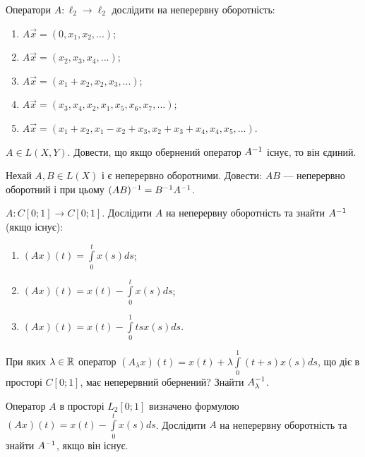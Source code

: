 
\begin{exercise}
    Оператори $A: \ell_2 \to \ell_2$ дослідити на неперервну оборотність:
    \begin{enumerate}
        \item $A\vec{x} = (0, x_1, x_2, ...)$;
        \item $A\vec{x} = (x_2, x_3, x_4, ...)$;
        \item $A\vec{x} = (x_1+x_2, x_2, x_3, ...)$;
        \item $A\vec{x} = (x_3, x_4, x_2, x_1, x_5, x_6, x_7, ...)$;
        \item $A\vec{x} = (x_1+x_2, x_1 - x_2 + x_3, x_2 + x_3 + x_4, x_4, x_5, ...)$.
    \end{enumerate}
\end{exercise}

\begin{exercise}
    $A \in L(X, Y)$. Довести, що якщо обернений оператор $A^{-1}$
    існує, то він єдиний.
\end{exercise}

\begin{exercise}
    Нехай $A, B \in L(X)$ і є неперервно оборотними.
    Довести: $AB$ --- неперервно оборотний і при цьому $(AB)^{-1} = B^{-1} A^{-1}$.
\end{exercise}

\begin{exercise}
    $A: C[0;1] \to C[0;1]$. Дослідити $A$ на неперервну оборотність та знайти $A^{-1}$ (якщо існує):
    \begin{enumerate}
        \item $(Ax)(t) = \int\limits_0^t x(s)ds$;
        \item $(Ax)(t) = x(t) - \int\limits_0^t x(s)ds$;
        \item $(Ax)(t) = x(t) - \int\limits_0^1 t s x(s) ds$.
    \end{enumerate}
\end{exercise}

\begin{exercise}
    При яких $\lambda \in \mathbb{R}$ оператор $(A_\lambda x)(t) = x(t) + \lambda \int\limits_0^1 (t+s) x(s) ds$,
    що діє в просторі $C[0;1]$, має неперервний обернений? Знайти $A_\lambda^{-1}$.
\end{exercise}

\begin{exercise}
    Оператор $A$ в просторі $L_2 [0;1]$ визначено формулою $(Ax)(t) = x(t) - \int\limits_0^t x(s) ds$.
    Дослідити $A$ на неперервну оборотність та знайти $A^{-1}$, якщо він існує.
\end{exercise}

